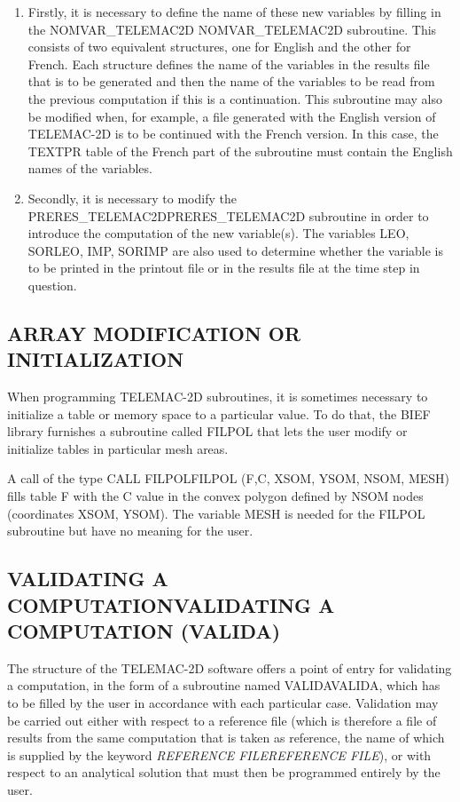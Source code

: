 \documentclass{article} %
\begin{document}
\begin{enumerate}
\item  Firstly, it is necessary to define the name of these new variables by filling in the NOMVAR\_TELEMAC2D NOMVAR\_TELEMAC2D subroutine. This consists of two equivalent structures, one for English and the other for French. Each structure defines the name of the variables in the results file that is to be generated and then the name of the variables to be read from the previous computation if this is a continuation. This subroutine may also be modified when, for example, a file generated with the English version of TELEMAC-2D  is to be continued with the French version. In this case, the TEXTPR table of the French part of the subroutine must contain the English names of the variables.

\item  Secondly, it is necessary to modify the PRERES\_TELEMAC2DPRERES\_TELEMAC2D subroutine in order to introduce the computation of the new variable(s). The variables LEO, SORLEO, IMP, SORIMP are also used to determine whether the variable is to be printed in the printout file or in the results file at the time step in question.
\end{enumerate}


\subsection{ ARRAY MODIFICATION OR INITIALIZATION}

 When programming TELEMAC-2D subroutines, it is sometimes necessary to initialize a table or memory space to a particular value. To do that, the BIEF library furnishes a subroutine called FILPOL that lets the user modify or initialize tables in particular mesh areas.

 A call of the type CALL FILPOLFILPOL (F,C, XSOM, YSOM, NSOM, MESH) fills table F with the C value in the convex polygon defined by NSOM nodes (coordinates XSOM, YSOM). The variable MESH is needed for the FILPOL subroutine but have no meaning for the user.


\subsection{ VALIDATING A COMPUTATIONVALIDATING A COMPUTATION (VALIDA) }

 The structure of the TELEMAC-2D software offers a point of entry for validating a computation, in the form of a subroutine named VALIDAVALIDA, which has to be filled by the user in accordance with each particular case. Validation may be carried out either with respect to a reference file (which is therefore a file of results from the same computation that is taken as reference, the name of which is supplied by the keyword \textit{REFERENCE FILEREFERENCE FILE}), or with respect to an analytical solution that must then be programmed entirely by the user.
\end{document}
